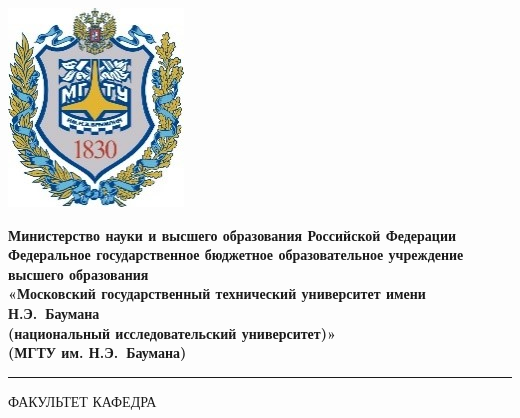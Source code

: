 \documentclass[a4paper,12pt]{article}
\begin{document}
	\thispagestyle{empty}
	
	\noindent \begin{minipage}{0.15\textwidth}
		\includegraphics[width=\linewidth]{b_logo}
	\end{minipage}
	\noindent\begin{minipage}{0.9\textwidth}\centering
		\textbf{Министерство науки и высшего образования Российской Федерации}\\
		\textbf{Федеральное государственное бюджетное образовательное учреждение высшего образования}\\
		\textbf{«Московский государственный технический университет имени Н.Э.~Баумана}\\
		\textbf{(национальный исследовательский университет)»}\\
		\textbf{(МГТУ им. Н.Э.~Баумана)}
	\end{minipage}
	
	\noindent\rule{18cm}{3pt}
	\newline\newline
	\noindent ФАКУЛЬТЕТ  \newline\newline
	\noindent КАФЕДРА \newline\newline
	\newline
	
\end{document}
